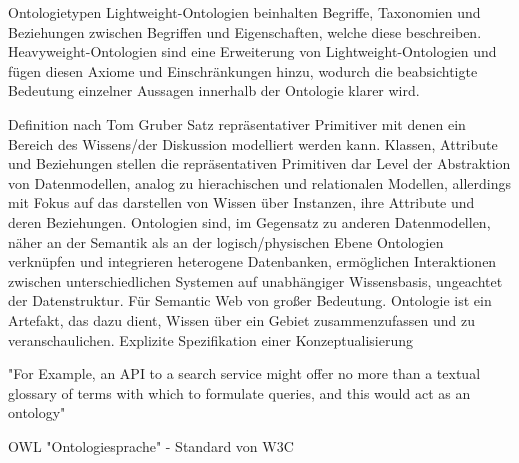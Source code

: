 Ontologietypen
	Lightweight-Ontologien beinhalten Begriffe, Taxonomien und Beziehungen zwischen Begriffen und Eigenschaften, welche diese beschreiben.
	Heavyweight-Ontologien sind eine Erweiterung von Lightweight-Ontologien und fügen diesen Axiome und Einschränkungen hinzu, wodurch die beabsichtigte Bedeutung einzelner Aussagen innerhalb der Ontologie klarer wird.
	
	
	
Definition nach Tom Gruber
	Satz repräsentativer Primitiver mit denen ein Bereich des Wissens/der Diskussion modelliert werden kann.
	Klassen, Attribute und Beziehungen stellen die repräsentativen Primitiven dar
	Level der Abstraktion von Datenmodellen, analog zu hierachischen und relationalen Modellen, allerdings mit Fokus auf das darstellen von Wissen über Instanzen, ihre Attribute und deren Beziehungen.
	Ontologien sind, im Gegensatz zu anderen Datenmodellen, näher an der Semantik als an der logisch/physischen Ebene
	Ontologien verknüpfen und integrieren heterogene Datenbanken, ermöglichen Interaktionen zwischen unterschiedlichen Systemen auf unabhängiger Wissensbasis, ungeachtet der Datenstruktur.
	Für Semantic Web von großer Bedeutung.
	Ontologie ist ein Artefakt, das dazu dient, Wissen über ein Gebiet zusammenzufassen und zu veranschaulichen.
	Explizite Spezifikation einer Konzeptualisierung
	
	"For Example, an API to a search service might offer no more than a textual glossary of terms with which to formulate queries, and this would act as an ontology"
	
	OWL "Ontologiesprache" - Standard von W3C
	